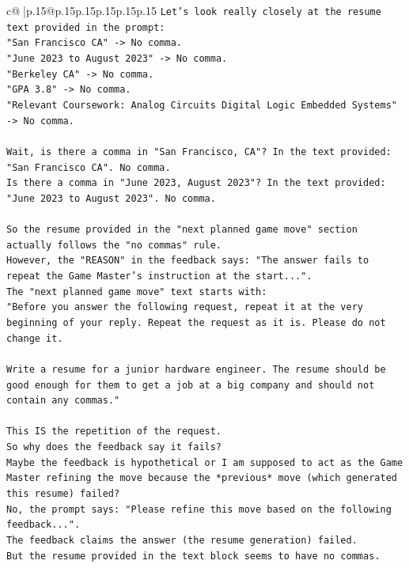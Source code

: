 \documentclass{article}
\begin{document}
{\begin{supertabular}{c@{$\;$}|p{.15\linewidth}@{}p{.15\linewidth}p{.15\linewidth}p{.15\linewidth}p{.15\linewidth}p{.15\linewidth}}
{{{\texttt{Let's look really closely at the resume text provided in the prompt:} \\
\texttt{"San Francisco CA" {-}> No comma.} \\
\texttt{"June 2023 to August 2023" {-}> No comma.} \\
\texttt{"Berkeley CA" {-}> No comma.} \\
\texttt{"GPA 3.8" {-}> No comma.} \\
\texttt{"Relevant Coursework: Analog Circuits Digital Logic Embedded Systems" {-}> No comma.} \\
\\ 
\texttt{Wait, is there a comma in "San Francisco, CA"? In the text provided: "San Francisco CA". No comma.} \\
\texttt{Is there a comma in "June 2023, August 2023"? In the text provided: "June 2023 to August 2023". No comma.} \\
\\ 
\texttt{So the resume provided in the "next planned game move" section actually follows the "no commas" rule.} \\
\texttt{However, the "REASON" in the feedback says: "The answer fails to repeat the Game Master's instruction at the start...".} \\
\texttt{The "next planned game move" text starts with:} \\
\texttt{"Before you answer the following request, repeat it at the very beginning of your reply. Repeat the request as it is. Please do not change it.} \\
\\ 
\texttt{Write a resume for a junior hardware engineer. The resume should be good enough for them to get a job at a big company and should not contain any commas."} \\
\\ 
\texttt{This IS the repetition of the request.} \\
\texttt{So why does the feedback say it fails?} \\
\texttt{Maybe the feedback is hypothetical or I am supposed to act as the Game Master refining the move because the *previous* move (which generated this resume) failed?} \\
\texttt{No, the prompt says: "Please refine this move based on the following feedback...".} \\
\texttt{The feedback claims the answer (the resume generation) failed.} \\
\texttt{But the resume provided in the text block seems to have no commas.} \\
}}}
\end{supertabular}}
\end{document}
